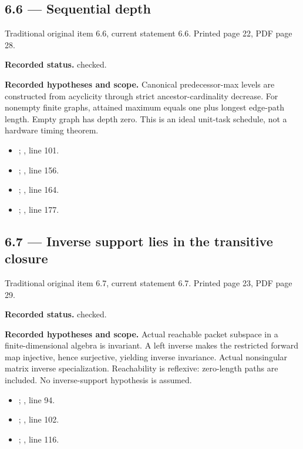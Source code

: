 \subsection{6.6 — Sequential depth}
\label{result:6.6}
{\footnotesize\color{muted}Traditional original item 6.6, current statement 6.6. Printed page 22, PDF page 28.}\par
\textbf{Recorded status.} checked.

\textbf{Recorded hypotheses and scope.} Canonical predecessor-max levels are constructed from acyclicity through strict ancestor-cardinality decrease. For nonempty finite graphs, attained maximum equals one plus longest edge-path length. Empty graph has depth zero. This is an ideal unit-task schedule, not a hardware timing theorem.

\begin{itemize}
\item {}; , line 101.
\item {}; , line 156.
\item {}; , line 164.
\item {}; , line 177.
\end{itemize}
\subsection{6.7 — Inverse support lies in the transitive closure}
\label{result:6.7}
{\footnotesize\color{muted}Traditional original item 6.7, current statement 6.7. Printed page 23, PDF page 29.}\par
\textbf{Recorded status.} checked.

\textbf{Recorded hypotheses and scope.} Actual reachable packet subspace in a finite-dimensional algebra is invariant. A left inverse makes the restricted forward map injective, hence surjective, yielding inverse invariance. Actual nonsingular matrix inverse specialization. Reachability is reflexive: zero-length paths are included. No inverse-support hypothesis is assumed.

\begin{itemize}
\item {}; , line 94.
\item {}; , line 102.
\item {}; , line 116.
\end{itemize}
